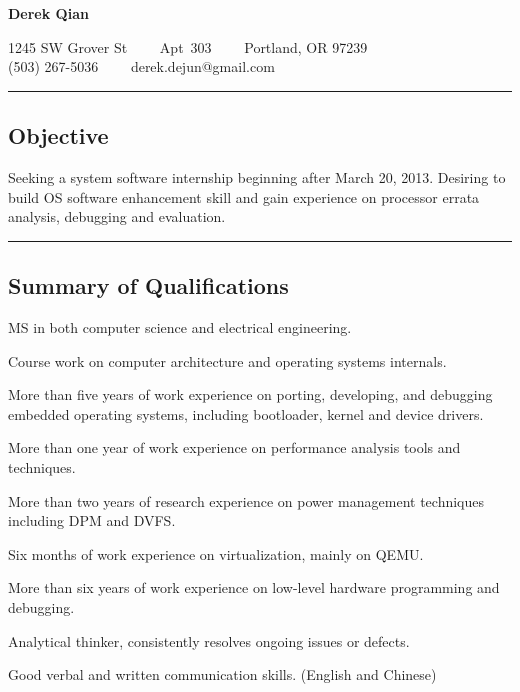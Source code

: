 \documentclass[10pt,letterpaper]{article}
\newenvironment{indentsection}[1]%
{\begin{list}{}%
	{\setlength{\leftmargin}{#1}}%
	\item[]%
}
{\end{list}}
\begin{document}
\begin{center}
{\LARGE \textbf{Derek Qian}}

1245 SW Grover St\ \ \textbullet
\ \ Apt\ 303\ \ \textbullet
\ \ Portland, OR 97239
\\
(503) 267-5036\ \ \textbullet
\ \ derek.dejun@gmail.com
\end{center}

\hrule
\vspace{-0.4em}
\subsection*{Objective}

\begin{indentsection}{\parindent}
Seeking a system software internship beginning after March 20, 2013. Desiring to build OS software enhancement skill and gain experience on processor errata analysis, debugging and evaluation.
\end{indentsection}

\hrule
\vspace{-0.4em}
\subsection*{Summary of Qualifications}
\begin{itemize*}
	\item MS in both computer science and electrical engineering.
	\item Course work on computer architecture and operating systems internals.
	\item More than five years of work experience on porting, developing, and debugging embedded operating systems, including bootloader, kernel and device drivers.
	\item More than one year of work experience on performance analysis tools and techniques.
	\item More than two years of research experience on power management techniques including DPM and DVFS.
	\item Six months of work experience on virtualization, mainly on QEMU.
	\item More than six years of work experience on low-level hardware programming and debugging.
	\item Analytical thinker, consistently resolves ongoing issues or defects.
	\item Good verbal and written communication skills. (English and Chinese)
\end{itemize*}
\end{document}
